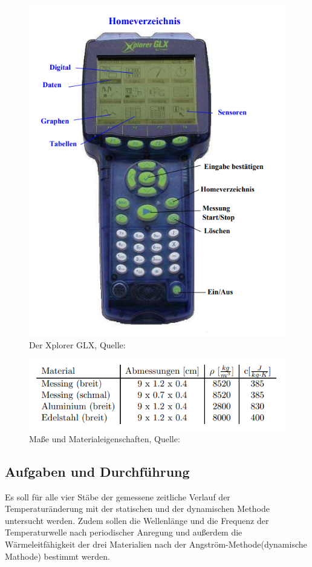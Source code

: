 \begin{figure}[H]
    \centering
    \includegraphics[scale=0.6]{content/GLX.png}
    \caption{Der Xplorer GLX, Quelle:\cite{sample}}
    \label{fig:GLX}
\end{figure}
\begin{figure}[H]
    \centering
    \includegraphics[scale=1]{content/StabDaten.png}
    \caption{Maße und Materialeigenschaften, Quelle:\cite{sample}}
    \label{fig:Masse}
\end{figure}
\subsection{Aufgaben und Durchführung}
\label{subsec:AufgDurch}
Es soll für alle vier Stäbe der gemessene zeitliche Verlauf der Temperaturänderung mit der statischen und
der dynamischen Methode untersucht werden. Zudem sollen die Wellenlänge und die Frequenz der Temperaturwelle
nach periodischer Anregung und außerdem die Wärmeleitfähigkeit der drei Materialien nach
der Angström-Methode(dynamische Mathode) bestimmt werden.
